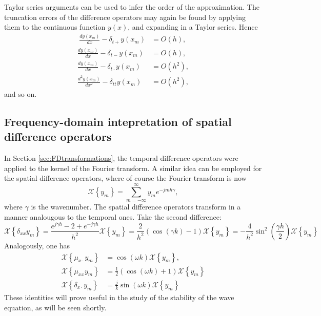 \documentclass[11pt,twoside,a4paper,english]{book}
\newcommand{\dsd}{\delta_{x\cdot}}
\newcommand{\dss}{\delta_{xx}}
\newcommand{\dtp}{\delta_{t+}}
\newcommand{\dtm}{\delta_{t-}}
\newcommand{\dtd}{\delta_{t\cdot}}
\newcommand{\dtt}{\delta_{tt}}
\begin{document}
Taylor series arguments can be used to infer the order of the approximation. The truncation errors of the difference operators may again be found by applying them to the continuous function $y(x)$, and expanding in a Taylor series. Hence
\begin{subequations}\label{eq:ErrsSpatial}
\begin{align}\
     \frac{dy(x_m)}{dx} - \dtp y(x_m) &= O(h), \\
     \frac{dy(x_m)}{dx} - \dtm y(x_m) &= O(h), \\   
     \frac{dy(x_m)}{dx} - \dtd y(x_m) &= O(h^2),\\   
     \frac{d^2y(x_m)}{dx^2} - \dtt y(x_m) &= O(h^2),
\end{align}
\end{subequations}
and so on. 



\subsection{Frequency-domain intepretation of spatial difference operators}\label{sec:FDtransformationsSpatial}

In Section \ref{sec:FDtransformations}, the temporal difference operators were applied to the kernel of the Fourier transform. A similar idea can be employed for the spatial difference operators, where of course the Fourier transform is now
\begin{equation}
\mathcal{X}\left\{ y_m \right\} = \sum_{m=-\infty}^\infty y_m e^{-jmh\gamma},
\end{equation}
where $\gamma$ is the wavenumber. The spatial difference operators transform in a manner analougous to the temporal ones. Take the second difference:
\begin{equation}\label{eq:DTFTdss}
\mathcal{X}\left\{\dss y_m\right\} = \frac{e^{j\gamma h}-2+e^{-j\gamma h}}{h^2}\mathcal{X}\left\{y_m\right\}=\frac{2}{h^2}\left(\cos(\gamma k)-1 \right)\mathcal{X}\left\{y_m\right\} = -\frac{4}{h^2} \sin^2\left(\frac{\gamma h}{2}\right)\mathcal{X}\left\{y_m\right\}
\end{equation}
Analogously, one has
\begin{subequations}
\begin{align}
\mathcal{X}\left\{\mu_{x\cdot} y_m\right\} &= \cos(\omega k) \mathcal{X}\left\{y_m \right\}, \\
\mathcal{X}\left\{\mu_{xx} y_m\right\} &= \frac{1}{2}\left(\cos(\omega k) + 1\right)\mathcal{X}\left\{y_m \right\} \\
\mathcal{X}\left\{\dsd y_m\right\} &= \frac{j}{k}\sin(\omega k) \mathcal{X}\left\{y_m \right\}
\end{align}
\end{subequations}
These identities will prove useful in the study of the stability of the wave equation, as will be seen shortly. 
\end{document}
